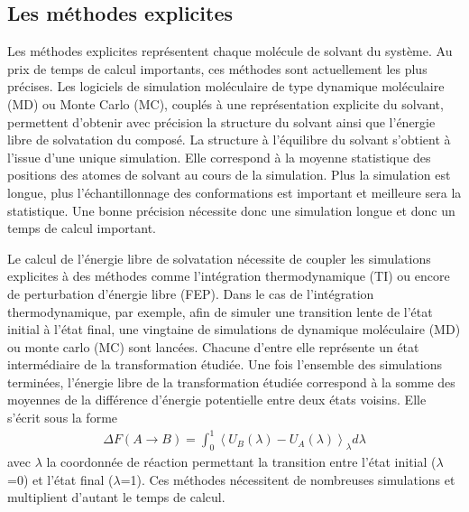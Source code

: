 \subsection{Les méthodes explicites}
Les méthodes explicites représentent chaque molécule de solvant du système. Au prix de temps de calcul importants, ces méthodes sont actuellement les plus précises. Les logiciels de simulation moléculaire de type dynamique moléculaire (MD) ou Monte Carlo (MC), couplés à une représentation explicite du solvant, permettent d'obtenir avec précision la structure du solvant ainsi que l'énergie libre de solvatation du composé. La structure à l'équilibre du solvant s'obtient à l'issue d'une unique simulation. Elle correspond à la moyenne statistique des positions des atomes de solvant au cours de la simulation. Plus la simulation est longue, plus l’échantillonnage des conformations est important et meilleure sera la statistique. Une bonne précision nécessite donc une simulation longue et donc un temps de calcul important.

Le calcul de l'énergie libre de solvatation nécessite de coupler les simulations explicites à des méthodes comme l'intégration thermodynamique (TI) ou encore de perturbation d'énergie libre (FEP)\cite{Skyner_review_2015, Hansen_Practical_2014, Christ_basic_2009}. Dans le cas de l'intégration thermodynamique, par exemple, afin de simuler une transition lente de l'état initial à l'état final, une vingtaine de simulations de dynamique moléculaire (MD) ou monte carlo (MC) sont lancées. Chacune d'entre elle représente un état intermédiaire de la transformation étudiée. Une fois l'ensemble des simulations terminées, l'énergie libre de la transformation étudiée correspond à la somme des moyennes de la différence d'énergie potentielle entre deux états voisins. Elle s'écrit sous la forme
\begin{eqnarray}
\Delta F(A \rightarrow B) =  \int_0^1 \left\langle U_B(\lambda) - U_A(\lambda) \right\rangle_{\lambda} d\lambda
\end{eqnarray}
\noindent avec $\lambda$ la coordonnée de réaction permettant la transition entre l'état initial ($\lambda$=0) et l'état final ($\lambda$=1).
Ces méthodes nécessitent de nombreuses simulations et multiplient d'autant le temps de calcul.



